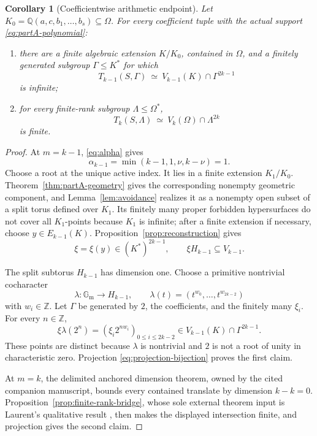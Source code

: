 \documentclass[11pt]{article}
\newcommand{\Gm}{\mathbb{G}_{\mathrm m}}
\newcommand{\Z}{\mathbb{Z}}
\newcommand{\Q}{\mathbb{Q}}
\newcommand{\Om}{\Omega}
\newtheorem{corollary}[lemma]{Corollary}
\theoremstyle{remark}
\numberwithin{equation}{section}
\begin{document}
\begin{corollary}[Coefficientwise arithmetic endpoint]\label{cor:partA-arithmetic}
Let \(K_0=\Q(a,c,b_1,\ldots,b_s)\subseteq\Om\).  For every coefficient tuple with the actual support \eqref{eq:partA-polynomial}:
\begin{enumerate}
\item there are a finite algebraic extension \(K/K_0\), contained in \(\Om\), and a finitely generated subgroup \(\Gamma\leq K^\ast\) for which
\[
 T_{k-1}(S,\Gamma)
 \ \simeq\ V_{k-1}(K)\cap\Gamma^{2k-1}
\]
is infinite;
\item for every finite-rank subgroup \(\Lambda\leq\Om^\ast\),
\[
 T_k(S,\Lambda)
 \ \simeq\ V_k(\Om)\cap\Lambda^{2k}
\]
is finite.
\end{enumerate}
\end{corollary}

\begin{proof}
At \(m=k-1\), \eqref{eq:alpha} gives
\[
 \alpha_{k-1}=\min(k-1,1,\nu,k-\nu)=1.
\]
Choose a root at the unique active index.  It lies in a finite extension \(K_1/K_0\).  Theorem~\ref{thm:partA-geometry} gives the corresponding nonempty geometric component, and Lemma~\ref{lem:avoidance} realizes it as a nonempty open subset of a split torus defined over \(K_1\).  Its finitely many proper forbidden hypersurfaces do not cover all \(K_1\)-points because \(K_1\) is infinite; after a finite extension if necessary, choose \(y\in E_{k-1}(K)\).  Proposition~\ref{prop:reconstruction} gives
\[
 \xi=\xi(y)\in(K^\ast)^{2k-1},\qquad
 \xi H_{k-1}\subseteq V_{k-1}.
\]

The split subtorus \(H_{k-1}\) has dimension one.  Choose a primitive nontrivial cocharacter
\[
 \lambda:\Gm\longrightarrow H_{k-1},\qquad
 \lambda(t)=(t^{w_0},\ldots,t^{w_{2k-2}})
\]
with \(w_i\in\Z\).  Let \(\Gamma\) be generated by \(2\), the coefficients, and the finitely many \(\xi_i\).  For every \(n\in\Z\),
\[
 \xi\lambda(2^n)
 =(\xi_i2^{nw_i})_{0\leq i\leq2k-2}
 \in V_{k-1}(K)\cap\Gamma^{2k-1}.
\]
These points are distinct because \(\lambda\) is nontrivial and \(2\) is not a root of unity in characteristic zero.  Projection \eqref{eq:projection-bijection} proves the first claim.

At \(m=k\), the delimited anchored dimension theorem, owned by the cited companion manuscript, bounds every contained translate by dimension \(k-k=0\).  Proposition~\ref{prop:finite-rank-bridge}, whose sole external theorem input is Laurent's qualitative result \citep{laurent1984equations}, then makes the displayed intersection finite, and projection gives the second claim.
\end{proof}
\end{document}

